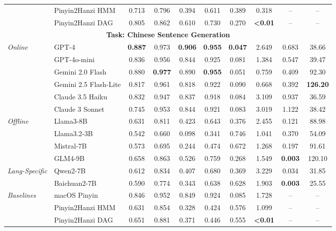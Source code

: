 \documentclass[10pt, a4paper]{article}
\begin{document}
\begin{table}[ht!]
{\begin{tabular}{l l cccccccc}
& Pinyin2Hanzi HMM & 0.713 & 0.796 & 0.394 & 0.611 & 0.389 & 0.318 & -- & -- \\
& Pinyin2Hanzi DAG & 0.805 & 0.862 & 0.610 & 0.730 & 0.270 & \textbf{<0.01} & -- & -- \\
\midrule
\multicolumn{10}{c}{\textbf{Task: Chinese Sentence Generation}} \\
\midrule
\textit{Online} & GPT-4 & \textbf{0.887} & 0.973 & \textbf{0.906} & \textbf{0.955} & \textbf{0.047} & 2.649 & 0.683 & 38.66 \\
& GPT-4o-mini & 0.836 & 0.956 & 0.844 & 0.925 & 0.081 & 1.384 & 0.547 & 39.47 \\
& Gemini 2.0 Flash & 0.880 & \textbf{0.977} & 0.890 & \textbf{0.955} & 0.051 & 0.759 & 0.409 & 92.30 \\
& Gemini 2.5 Flash-Lite & 0.817 & 0.961 & 0.818 & 0.922 & 0.090 & {0.668} & 0.392 & \textbf{126.20} \\
& Claude 3.5 Haiku & 0.832 & 0.947 & 0.837 & 0.918 & 0.084 & 3.109 & 0.937 & 36.59 \\
& Claude 3 Sonnet & 0.745 & 0.953 & 0.844 & 0.921 & 0.083 & 3.019 & 1.122 & 38.42 \\
\midrule
\textit{Offline} & Llama3-8B & 0.631 & 0.811 & 0.423 & 0.643 & 0.376 & 2.455 & 0.121 & 88.98 \\
& Llama3.2-3B & 0.542 & 0.660 & 0.098 & 0.341 & 0.746 & 1.041 & {0.370} & 54.09 \\
& Mistral-7B & 0.573 & 0.695 & 0.244 & 0.474 & 0.672 & 1.268 & 0.197 & 91.61 \\
& GLM4-9B & 0.658 & 0.863 & 0.526 & 0.759 & 0.268 & 1.549 & \textbf{0.003} & 120.10 \\
\midrule
\textit{Lang-Specific} & Qwen2-7B & 0.612 & 0.834 & 0.407 & 0.680 & 0.369 & 3.229 & 0.034 & 31.85 \\
& Baichuan2-7B & 0.590 & 0.774 & 0.343 & 0.638 & 0.628 & 1.903 & \textbf{0.003} & 25.55 \\
\midrule
\textit{Baselines} & macOS Pinyin & 0.846 & 0.952 & 0.849 & 0.924 & 0.085 & 1.728 & -- & -- \\
& Pinyin2Hanzi HMM & 0.631 & 0.854 & 0.328 & 0.424 & 0.576 & 1.099 & -- & -- \\
& Pinyin2Hanzi DAG & 0.651 & 0.881 & 0.371 & 0.446 & 0.555 & \textbf{<0.01} & -- & -- \\
\bottomrule
\end{tabular}
}
\end{table}
\end{document}
